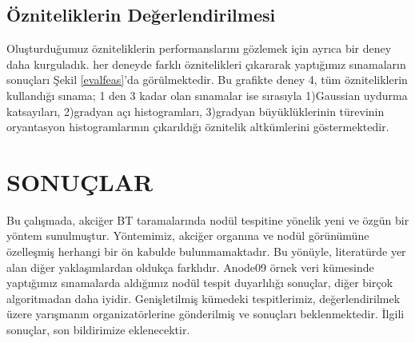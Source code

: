 \documentclass[conference]{IEEEtran}
\begin{document}
\subsection{Özniteliklerin Değerlendirilmesi}
Oluşturduğumuz özniteliklerin performanslarını gözlemek için ayrıca bir deney daha kurguladık.
her deneyde farklı öznitelikleri çıkararak yaptığımız sınamaların sonuçları Şekil \ref{evalfeas}'da görülmektedir. Bu grafikte deney 4, tüm özniteliklerin kullandığı sınama; 1 den 3 kadar olan sınamalar ise sırasıyla 1)Gaussian uydurma katsayıları, 2)gradyan açı histogramları, 3)gradyan büyüklüklerinin türevinin oryantasyon histogramlarının çıkarıldığı öznitelik altkümlerini göstermektedir.


\section{SONUÇLAR}
Bu çalışmada, akciğer BT taramalarında nodül tespitine yönelik yeni ve özgün bir yöntem sunulmuştur. Yöntemimiz, akciğer organına ve nodül görünümüne özelleşmiş herhangi bir ön kabulde bulunmamaktadır. Bu yönüyle, literatürde yer alan diğer yaklaşımlardan oldukça farklıdır. Anode09 örnek veri kümesinde yaptığımız sınamalarda aldığımız nodül tespit duyarlılığı sonuçlar, diğer birçok algoritmadan daha iyidir. Genişletilmiş kümedeki tespitlerimiz, değerlendirilmek üzere yarışmanın organizatörlerine gönderilmiş ve sonuçları beklenmektedir. İlgili sonuçlar, son bildirimize eklenecektir.

%
%
\end{document}
